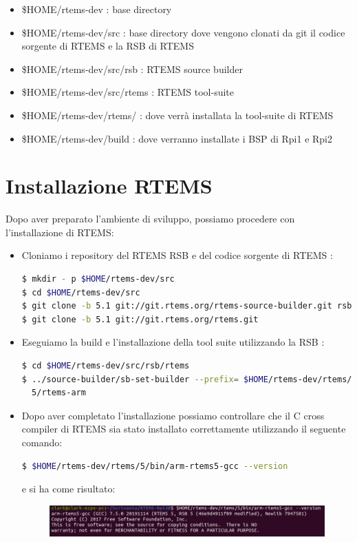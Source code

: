 \documentclass[12pt, a4paper]{article}
\begin{document}
\begin{flushleft}
\begin{itemize}
\item \$HOME/rtems-dev  : base directory
\item \$HOME/rtems-dev/src : base directory dove vengono clonati da git il codice sorgente di RTEMS e la RSB di RTEMS
\item \$HOME/rtems-dev/src/rsb : RTEMS source builder
\item \$HOME/rtems-dev/src/rtems : RTEMS tool-suite
\item \$HOME/rtems-dev/rtems/ : dove verrà installata la tool-suite di RTEMS 
\item \$HOME/rtems-dev/build : dove verranno installate i BSP di Rpi1 e Rpi2
\end{itemize}
\newpage
\section{Installazione RTEMS}

Dopo aver preparato l'ambiente di sviluppo, possiamo procedere con l'installazione di RTEMS:
\begin{itemize}

\item Cloniamo i repository del RTEMS RSB e del codice sorgente di RTEMS : 
\begin{lstlisting}[language=bash] 
$ mkdir - p $HOME/rtems-dev/src
$ cd $HOME/rtems-dev/src
$ git clone -b 5.1 git://git.rtems.org/rtems-source-builder.git rsb
$ git clone -b 5.1 git://git.rtems.org/rtems.git
\end{lstlisting}

\item Eseguiamo la build e l'installazione della tool suite utilizzando la RSB :
\begin{lstlisting}[language=bash] 
$ cd $HOME/rtems-dev/src/rsb/rtems
$ ../source-builder/sb-set-builder --prefix= $HOME/rtems-dev/rtems/5 \
  5/rtems-arm
\end{lstlisting}

\item Dopo aver completato l'installazione possiamo controllare che il C cross compiler di RTEMS sia stato installato correttamente utilizzando il seguente comando: 
\begin{lstlisting}[language=bash] 
$ $HOME/rtems-dev/rtems/5/bin/arm-rtems5-gcc --version
\end{lstlisting}	
e si ha come risultato:
\begin{figure}[h!]
\includegraphics[width=\linewidth]{rtems-gcc-version.png}
\end{figure}


\end{itemize}
\end{flushleft}
\end{document}

